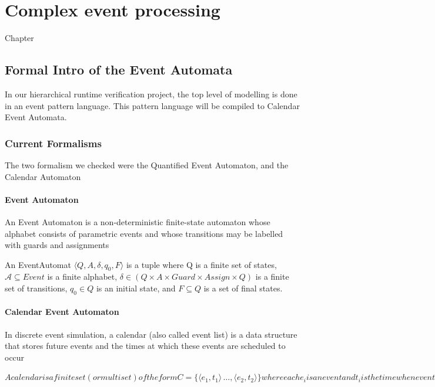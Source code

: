 \chapter{Complex event processing}
\label{chap:cep}
Chapter
\section{Formal Intro of the Event Automata}
	In our hierarchical runtime verification project, the top level of modelling is done in an event pattern language.
	This pattern language will be compiled to Calendar Event Automata.
	\subsection{Current Formalisms}
		The two formalism we checked were the Quantified Event Automaton, and the Calendar Automaton
		\subsubsection{Event Automaton}
			An Event Automaton is a non-deterministic finite-state automaton whose alphabet consists
			of parametric events and whose transitions may be labelled with guards and assignments
			
			\begin{dfn}
			An EventAutomat 
			$\langle Q,A,\delta, q_0, F \rangle$ is a tuple where Q is a finite set of states, 
			$\mathcal{A} \subseteq Event$ is a finite alphabet,  %
			$\delta \in (Q \times A \times Guard \times Assign \times Q)$ is a finite set of transitions, 
			$q_0 \in Q$ is an initial state, and 
			$F \subseteq Q$ is a set of final states.
			\end{dfn}
			
		\subsubsection{Calendar Event Automaton}
			In discrete event simulation, a calendar (also called event list) is a data structure that
			stores future events and the times at which these events are scheduled to occur
			
			\begin{dfn}
			$A calendar is a finite set (or multiset) of the form C = \{ \langle e_1, t_1\rangle \, \dots ,\langle e_2, t_2\rangle \}
			where each e_i is an event and t_i is the time when event e_i is scheduled to occur. All t_is are real numbers.
			We denote by min(C) the smallest number among \{t_1,\dots ,t_n \} (with min (C) = +\infty if C is empty)
			Given a real u, we denote by Ev_u(C) the subset of C that contains all events scheduled at time u:
			
			Ev_u(C) = \{ \langle e_i, t_i \rangle  | t_i = u \wedge \langle e_i, t_i \rangle \in C \} $
			\end{dfn}
			
